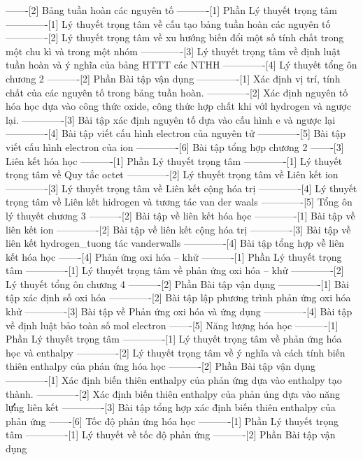 -------[2] Bảng tuần hoàn các nguyên tố
----------[1] Phần Lý thuyết trọng tâm
-------------[1] Lý thuyết trọng tâm về cấu tạo bảng tuần hoàn các nguyên tố
-------------[2] Lý thuyết trọng tâm về xu hướng biến đổi một số tính chất trong một chu kì và trong một nhóm
-------------[3] Lý thuyết trọng tâm về định luật tuần hoàn và ý nghĩa của bảng HTTT các NTHH
-------------[4] Lý thuyết tổng ôn chương 2
----------[2] Phần Bài tập vận dụng
-------------[1] Xác định vị trí, tính chất của các nguyên tố trong bảng tuần hoàn.
-------------[2] Xác định nguyên tố hóa học dựa vào công thức oxide, công thức hợp chất khi vớl hydrogen và ngược lại.
-------------[3] Bài tập xác định nguyên tố dựa vào cấu hình e và ngược lại
-------------[4] Bài tập viết cấu hình electron của nguyên tử
-------------[5] Bài tập viết cấu hình electron của ion
-------------[6] Bài tập tổng hợp chương 2
-------[3] Liên kết hóa học
----------[1] Phần Lý thuyết trọng tâm
-------------[1] Lý thuyết trọng tâm về Quy tắc octet
-------------[2] Lý thuyết trọng tâm về Liên kết ion
-------------[3] Lý thuyết trọng tâm về Liên kết cộng hóa trị
-------------[4] Lý thuyết trọng tâm về Liên kết hidrogen và tương tác van der waals 
-------------[5] Tổng ôn lý thuyết chương 3
----------[2] Bài tập về liên kết hóa học
-------------[1] Bài tập về liên kết ion
-------------[2] Bài tập về liên kết cộng hóa trị
-------------[3] Bài tập về liên kết hydrogen_tuong tác vanderwalls
-------------[4] Bài tập tổng hợp về liên kết hóa học
-------[4] Phản ứng oxi hóa – khử
----------[1] Phần Lý thuyết trọng tâm
-------------[1] Lý thuyết trọng tâm về phản ứng oxi hóa – khử
-------------[2] Lý thuyết tổng ôn chương 4
----------[2] Phần Bài tập vận dụng
-------------[1] Bài tập xác định số oxi hóa
-------------[2] Bài tập lập phương trình phản ứng oxi hóa khử
-------------[3] Bài tập về Phản ứng oxi hóa và ứng dụng
-------------[4] Bài tập về định luật bảo toàn số mol electron
-------[5] Năng lượng hóa học
----------[1] Phần Lý thuyết trọng tâm
-------------[1] Lý thuyết trọng tâm về phản ứng hóa học và enthalpy
-------------[2] Lý thuyết trọng tâm về ý nghĩa và cách tính biến thiên enthalpy của phản ứng hóa học
----------[2] Phần Bài tập vận dụng
-------------[1] Xác định biến thiên enthalpy của phản ứng dựa vào enthalpy tạo thành.
-------------[2] Xác định biến thiên enthalpy của phản úng dựa vào năng lự̛̛ng liên kết
-------------[3] Bài tập tổng hợp xác đ̇ịnh biến thiên enthalpy của phản ứng
-------[6] Tốc độ phản ứng hóa học
----------[1] Phần Lý thuyết trọng tâm
-------------[1] Lý thuyết về tốc độ phản ứng
----------[2] Phần Bài tập vận dụng
